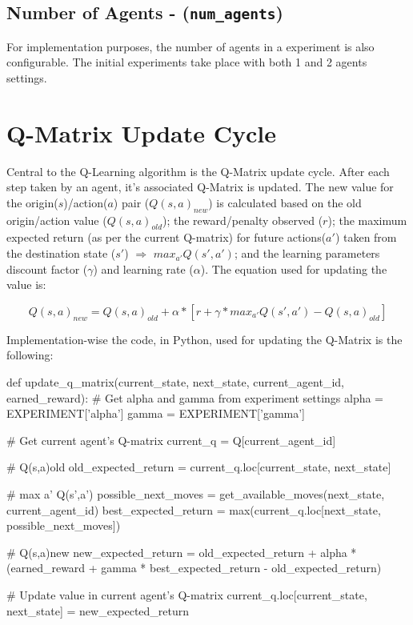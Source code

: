 \documentclass[11pt]{article}
\begin{document}
    \subsection{Number of Agents - (\texttt{num\_agents})}
        For implementation purposes, the number of agents in a experiment is also configurable. The initial experiments take place with both 1 and 2 agents settings.

\section{Q-Matrix Update Cycle}
    Central to the Q-Learning algorithm is the Q-Matrix update cycle. After each step taken by an agent, it's associated Q-Matrix is updated. The new value for the origin($s$)/action($a$) pair ($Q(s,a)_{new}$) is calculated based on the old origin/action value ($Q(s,a)_{old}$); the reward/penalty observed ($r$); the maximum expected return (as per the current Q-matrix) for future actions($a'$) taken from the destination state ($s'$) $\Rightarrow$ $max_{a'} Q(s',a')$; and the learning parameters discount factor ($\gamma$) and learning rate ($\alpha$). The equation used for updating the value is:

    \begin{equation}
        Q(s,a)_{new} = Q(s,a)_{old} + \alpha*[r+\gamma*max_{a'} Q(s',a') - Q(s,a)_{old}]
    \end{equation}

    Implementation-wise the code, in Python, used for updating the Q-Matrix is the following:

\onecolumn
    \begin{python}
def update_q_matrix(current_state, next_state, current_agent_id, earned_reward):
    # Get alpha and gamma from experiment settings
    alpha = EXPERIMENT['alpha']
    gamma = EXPERIMENT['gamma']

    # Get current agent's Q-matrix
    current_q = Q[current_agent_id]

    # Q(s,a)old
    old_expected_return = current_q.loc[current_state, next_state]

    # max a' Q(s',a')
    possible_next_moves = get_available_moves(next_state, current_agent_id)
    best_expected_return = max(current_q.loc[next_state, possible_next_moves])

    # Q(s,a)new
    new_expected_return = old_expected_return + alpha * (earned_reward + gamma * best_expected_return - old_expected_return)

    # Update value in current agent's Q-matrix
    current_q.loc[current_state, next_state] = new_expected_return
    \end{python}
\end{document}
